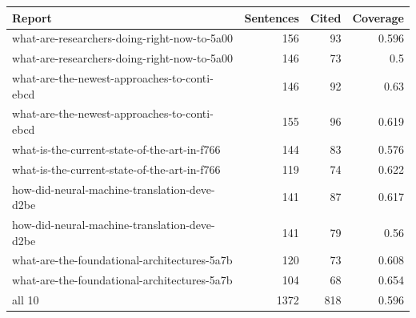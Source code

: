 \begin{tabular}{lrrr}
\toprule
Report & Sentences & Cited & Coverage \\
\midrule
what-are-researchers-doing-right-now-to-5a00 & 156 & 93 & 0.596 \\
what-are-researchers-doing-right-now-to-5a00 & 146 & 73 & 0.5 \\
what-are-the-newest-approaches-to-conti-ebcd & 146 & 92 & 0.63 \\
what-are-the-newest-approaches-to-conti-ebcd & 155 & 96 & 0.619 \\
what-is-the-current-state-of-the-art-in-f766 & 144 & 83 & 0.576 \\
what-is-the-current-state-of-the-art-in-f766 & 119 & 74 & 0.622 \\
how-did-neural-machine-translation-deve-d2be & 141 & 87 & 0.617 \\
how-did-neural-machine-translation-deve-d2be & 141 & 79 & 0.56 \\
what-are-the-foundational-architectures-5a7b & 120 & 73 & 0.608 \\
what-are-the-foundational-architectures-5a7b & 104 & 68 & 0.654 \\
all 10 & 1372 & 818 & 0.596 \\
\bottomrule
\end{tabular}
